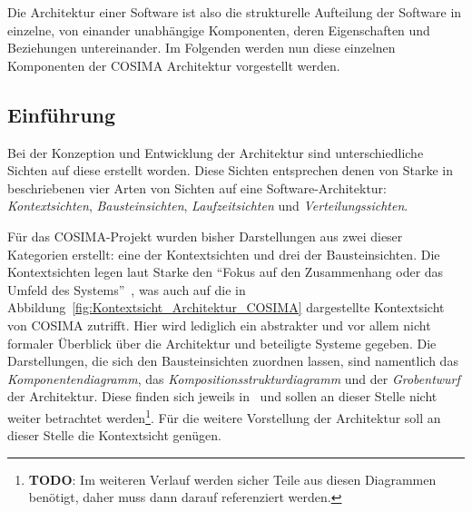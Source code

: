 
  Die Architektur einer Software ist also die strukturelle Aufteilung der Software in einzelne, von einander unabhängige Komponenten, deren Eigenschaften und Beziehungen untereinander. Im Folgenden werden nun diese einzelnen Komponenten der COSIMA Architektur vorgestellt werden.


\subsection{Einführung} %
\label{sub:einfuehrung}

  Bei der Konzeption und Entwicklung der Architektur sind unterschiedliche Sichten auf diese erstellt worden. Diese Sichten entsprechen denen von Starke in~\citep[S. 83]{effektive_software_architekturen} beschriebenen vier Arten von Sichten auf eine Software-Architektur: \emph{Kontextsichten}, \emph{Bausteinsichten}, \emph{Laufzeitsichten} und \emph{Verteilungssichten}.

  Für das COSIMA-Projekt wurden bisher Darstellungen aus zwei dieser Kategorien erstellt: eine der Kontextsichten und drei der Bausteinsichten. Die Kontextsichten legen laut Starke den "`Fokus auf den Zusammenhang oder das Umfeld des Systems"'~\citep[S. 87]{effektive_software_architekturen}, was auch auf die in Abbildung~\ref{fig:Kontextsicht_Architektur_COSIMA} dargestellte Kontextsicht von COSIMA zutrifft. Hier wird lediglich ein abstrakter und vor allem nicht formaler Überblick über die Architektur und beteiligte Systeme gegeben. Die Darstellungen, die sich den Bausteinsichten zuordnen lassen, sind namentlich das \emph{Komponentendiagramm}, das \emph{Kompositionsstrukturdiagramm} und der \emph{Grobentwurf} der Architektur. Diese finden sich jeweils in~\citep{bericht} und sollen an dieser Stelle nicht weiter betrachtet werden\footnote{\textbf{TODO}: Im weiteren Verlauf werden sicher Teile aus diesen Diagrammen benötigt, daher muss dann darauf referenziert werden.}. Für die weitere Vorstellung der Architektur soll an dieser Stelle die Kontextsicht genügen.

